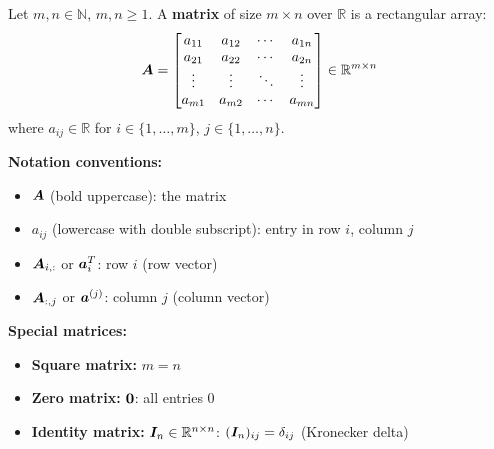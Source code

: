 \begin{definition}
    \label{def:matrix}
    Let $m, n \in \mathbb{N}$, $m, n \geq 1$. A \textbf{matrix} of size $m \times n$ over $\mathbb{R}$ is a rectangular array:
    \[
        \bm{A} = \begin{bmatrix}
            a_{11} & a_{12} & \cdots & a_{1n} \\
            a_{21} & a_{22} & \cdots & a_{2n} \\
            \vdots & \vdots & \ddots & \vdots \\
            a_{m1} & a_{m2} & \cdots & a_{mn}
        \end{bmatrix} \in \mathbb{R}^{m \times n}
    \]
    where $a_{ij} \in \mathbb{R}$ for $i \in \{1, \ldots, m\}$, $j \in \{1, \ldots,
        n\}$.

    \textbf{Notation conventions:}
    \begin{itemize}
        \item $\bm{A}$ (bold uppercase): the matrix
        \item $a_{ij}$ (lowercase with double subscript): entry in row $i$, column $j$
        \item $\bm{A}_{i,:}$ or $\bm{a}_i^T$: row $i$ (row vector)
        \item $\bm{A}_{:,j}$ or $\bm{a}^{(j)}$: column $j$ (column vector)
    \end{itemize}

    \textbf{Special matrices:}
    \begin{itemize}
        \item \textbf{Square matrix:} $m = n$
        \item \textbf{Zero matrix:} $\bm{0}$: all entries 0
        \item \textbf{Identity matrix:} $\bm{I}_n \in \mathbb{R}^{n \times n}$: $(\bm{I}_n)_{ij} = \delta_{ij}$ (Kronecker delta)
    \end{itemize}
\end{definition}


